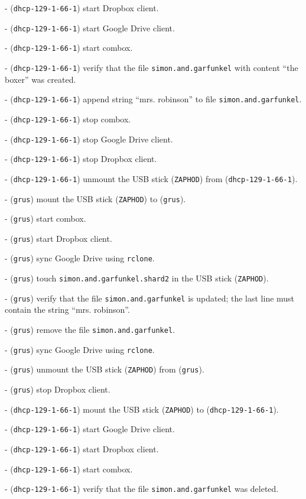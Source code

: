   - (\verb+dhcp-129-1-66-1+) start Dropbox client.

  - (\verb+dhcp-129-1-66-1+) start Google Drive client.

  - (\verb+dhcp-129-1-66-1+) start combox.

  - (\verb+dhcp-129-1-66-1+) verify that the file
  \verb+simon.and.garfunkel+ with content ``the boxer'' was created.

  - (\verb+dhcp-129-1-66-1+) append string ``mrs. robinson'' to file
  \verb+simon.and.garfunkel+.

  - (\verb+dhcp-129-1-66-1+) stop combox.

  - (\verb+dhcp-129-1-66-1+) stop Google Drive client.

  - (\verb+dhcp-129-1-66-1+) stop Dropbox client.

  - (\verb+dhcp-129-1-66-1+) unmount the USB stick (\verb+ZAPHOD+)
  from (\verb+dhcp-129-1-66-1+).

  - (\verb+grus+) mount the USB stick (\verb+ZAPHOD+) to
  (\verb+grus+).

  - (\verb+grus+) start combox.

  - (\verb+grus+) start Dropbox client.

  - (\verb+grus+) sync Google Drive using \verb+rclone+.

  - (\verb+grus+) touch \verb+simon.and.garfunkel.shard2+ in the USB
  stick (\verb+ZAPHOD+).

  - (\verb+grus+) verify that the file \verb+simon.and.garfunkel+ is
  updated; the last line must contain the string ``mrs. robinson''.

  - (\verb+grus+) remove the file \verb+simon.and.garfunkel+.

  - (\verb+grus+) sync Google Drive using \verb+rclone+.

  - (\verb+grus+) unmount the USB stick (\verb+ZAPHOD+) from
  (\verb+grus+).

  - (\verb+grus+) stop Dropbox client.

  - (\verb+dhcp-129-1-66-1+) mount the USB stick (\verb+ZAPHOD+) to
  (\verb+dhcp-129-1-66-1+).

  - (\verb+dhcp-129-1-66-1+) start Google Drive client.

  - (\verb+dhcp-129-1-66-1+) start Dropbox client.

  - (\verb+dhcp-129-1-66-1+) start combox.

  - (\verb+dhcp-129-1-66-1+) verify that the file
  \verb+simon.and.garfunkel+ was deleted.


